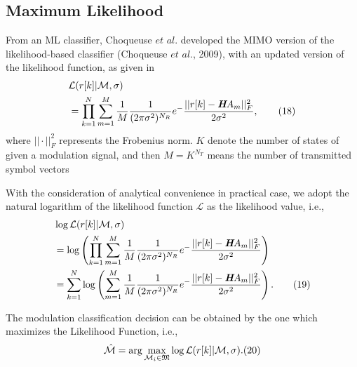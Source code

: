 \documentclass[conference]{IEEEtran}
\begin{document}
\subsection{ Maximum Likelihood}
From an ML classifier, Choqueuse $et$ $al$. developed the MIMO version of the likelihood-based classifier (Choqueuse $et$ $al$., 2009), with an updated version of the likelihood function, as given in
\begin{align*}
&\mathcal{L}({r[k]|\mathcal{M},\sigma})\\
&=\prod_{k=1}^{N}\sum_{m=1}^{M}\frac{1}{M}\frac{1}{(2\pi\sigma^2)^{N_{R}}}e^-\frac{||r[k]-\emph{\textbf{H}}{A_m}||^2_F}{2\sigma^2},\tag{18}
\end{align*}
where $||\cdot||^2_F$ represents the Frobenius norm. $K$ denote the number of states of given a modulation signal, and then $M=K^{N_{T}}$ means the number of transmitted symbol vectors
\par With the consideration of analytical convenience in practical case, we adopt the natural logarithm of the likelihood function $\mathcal{L}$ as the likelihood value, i.e.,
\begin{align*}
&\log\mathcal{L}({r[k]|\mathcal{M},\sigma})\\
&=\log\left(\prod_{k=1}^{N}\sum_{m=1}^{M}\frac{1}{M}\frac{1}{(2\pi\sigma^2)^{N_{R}}}e^-\frac{||r[k]-\emph{\textbf{H}}{A_m}||^2_F}{2\sigma^2}\right)\\
&=\sum_{k=1}^{N}\log\left(\sum_{m=1}^{M}\frac{1}{M}\frac{1}{(2\pi\sigma^2)^{N_{R}}}e^-\frac{||r[k]-\emph{\textbf{H}}{A_m}||^2_F}{2\sigma^2}\right).\tag{19}
\end{align*}
\par The modulation classification decision can be obtained by the one which maximizes the Likelihood Function, i.e.,
$$\hat{\mathcal{M}}=\arg\max_{\mathcal{M}_{i}\in \mathfrak{M}}\log\mathcal{L}({r[k]|\mathcal{M},\sigma}).\relax{(20)}$$
\end{document}
